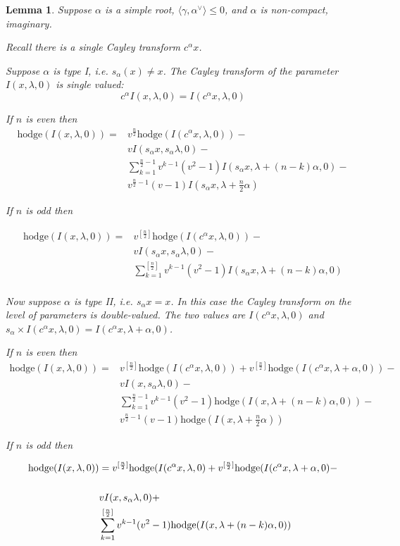 \documentclass[12pt,leqno]{article}
\newtheorem{lemma}[equation]{Lemma}
\newcommand{\hodge}{\text{hodge}}
\newcommand{\ch}[1]{#1^\vee}
\begin{document}
\begin{lemma}
Suppose $\alpha$ is a simple root, $\langle\gamma,\ch\alpha\rangle\le 0$, and $\alpha$ is non-compact, imaginary.

Recall there is a single Cayley transform $c^\alpha x$.

Suppose $\alpha$ is type I, i.e. $s_\alpha(x)\ne x$. The Cayley transform of the parameter $I(x,\lambda,0)$ is single valued:
$$
c^\alpha I(x,\lambda,0)=I(c^\alpha x,\lambda,0)
$$

If $n$ is even then
{\normalfont
$$
\begin{aligned}
\hodge(I(x,\lambda,0))=&v^{\frac n2}\hodge(I(c^\alpha x,\lambda,0))-\\
&vI(s_\alpha x,s_\alpha\lambda,0)-\\
&\sum_{k=1}^{\frac n2-1}v^{k-1}(v^2-1)I(s_\alpha x,\lambda+(n-k)\alpha,0)-\\
&v^{\frac n2-1}(v-1)I(s_\alpha x,\lambda+\frac n2\alpha)
\end{aligned}
$$
}

If $n$ is odd then

{\normalfont
$$
\begin{aligned}
\hodge(I(x,\lambda,0))=&v^{[\frac n2]}\hodge(I(c^\alpha x,\lambda,0))-\\
&vI(s_\alpha x,s_\alpha\lambda,0)-\\
&\sum_{k=1}^{[\frac n2]}v^{k-1}(v^2-1)I(s_\alpha x,\lambda+(n-k)\alpha,0)\\
\end{aligned}
$$
}

Now suppose $\alpha$ is type II, i.e. $s_\alpha x=x$. In this case the Cayley transform on the level of parameters is double-valued.
The two values are $I(c^\alpha x,\lambda,0)$ and $s_\alpha\times I(c^\alpha x,\lambda,0)=I(c^\alpha x,\lambda+\alpha,0)$.

If $n$ is even then
{\normalfont
$$
\begin{aligned}
\hodge(I(x,\lambda,0))=&
v^{[\frac n2]}\hodge(I(c^\alpha x,\lambda,0))+v^{[\frac n2]}\hodge(I(c^\alpha x,\lambda+\alpha,0))-\\
&vI(x,s_\alpha\lambda,0)-\\
&\sum_{k=1}^{\frac n2-1}v^{k-1}(v^2-1)\hodge(I(x,\lambda+(n-k)\alpha,0))-\\
&v^{\frac n2-1}(v-1)\hodge(I(x,\lambda+\frac n2\alpha))
\end{aligned}
$$
}

If $n$ is odd then


$$
{\normalfont
\begin{aligned}
\hodge(I(x,\lambda,0))&=
v^{[\frac n2]}\hodge(I(c^\alpha x,\lambda,0)+v^{[\frac n2]}\hodge(I(c^\alpha x,\lambda+\alpha,0)-\\
\\&vI(x,s_\alpha\lambda,0)+\\
&\sum_{k=1}^{[\frac n2]}v^{k-1}(v^2-1)\hodge(I(x,\lambda+(n-k)\alpha,0))\\
\end{aligned}
}
$$



\end{lemma}
\end{document}
